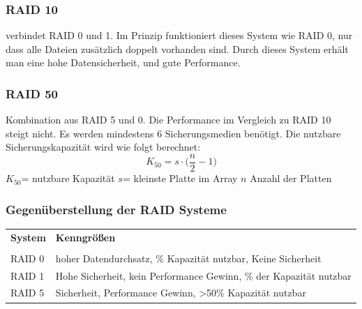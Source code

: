 \documentclass[12pt,a4paper]{article}
\begin{document}
\subsubsection{RAID 10}
    verbindet RAID 0 und 1. Im Prinzip funktioniert dieses System wie RAID 0, nur dass alle Dateien zusätzlich doppelt vorhanden sind. Durch dieses System erhält man eine hohe Datensicherheit, und gute Performance.

\subsubsection{RAID 50}
    Kombination aus RAID 5 und 0. Die Performance im Vergleich zu RAID 10 steigt nicht. Es werden mindestens 6 Sicherungsmedien benötigt. \newline
    Die nutzbare Sicherungskapazität wird wie folgt berechnet:
	\begin{equation*}
		K_{50} = s\cdot \Big(\dfrac{n}{2}-1\Big)
	\end{equation*}
    $K_{50}$= nutzbare Kapazität \hspace{1.5cm} $s$= kleinste Platte im Array \hspace{1.5cm} $n$ Anzahl der Platten

\subsubsection{Gegenüberstellung der RAID Systeme}
	\begin{table}[h]
		\centering
			\begin{tabularx}{15cm}{|XX|}
				\hline
				\textbf{System}&\textbf{Kenngrößen} \\
				& \\
				\hline
				RAID 0& hoher Datendurchsatz, \newline 100\% Kapazität nutzbar, \newline Keine Sicherheit \\
				\hline
				RAID 1& Hohe Sicherheit, \newline kein Performance Gewinn, \newline 50\% der Kapazität nutzbar\\
				\hline
				RAID 5& Sicherheit, \newline Performance Gewinn, \newline >50\% Kapazität nutzbar\\
				\hline
			\end{tabularx}
	\end{table}
\end{document}
